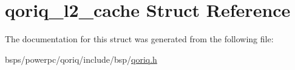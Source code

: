 \hypertarget{structqoriq__l2__cache}{}\section{qoriq\+\_\+l2\+\_\+cache Struct Reference}
\label{structqoriq__l2__cache}


The documentation for this struct was generated from the following file\+:\begin{DoxyCompactItemize}
\item 
bsps/powerpc/qoriq/include/bsp/\mbox{\hyperlink{qoriq_8h}{qoriq.\+h}}\end{DoxyCompactItemize}

